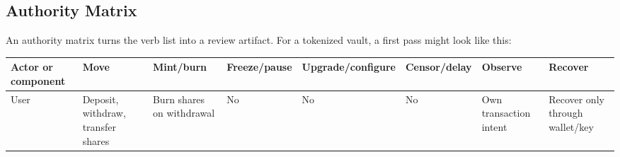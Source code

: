 \subsection{Authority Matrix}

An authority matrix turns the verb list into a review artifact. For a
tokenized vault, a first pass might look like this:

{\def\LTcaptype{none} %
\begin{longtable}[]{@{}
  >{\raggedright\arraybackslash}p{}
  >{\raggedright\arraybackslash}p{}
  >{\raggedright\arraybackslash}p{}
  >{\raggedright\arraybackslash}p{}
  >{\raggedright\arraybackslash}p{}
  >{\raggedright\arraybackslash}p{}
  >{\raggedright\arraybackslash}p{}
  >{\raggedright\arraybackslash}p{}@{}}
\toprule\noalign{}
\begin{minipage}[b]{\linewidth}\raggedright
Actor or component
\end{minipage} & \begin{minipage}[b]{\linewidth}\raggedright
Move
\end{minipage} & \begin{minipage}[b]{\linewidth}\raggedright
Mint/burn
\end{minipage} & \begin{minipage}[b]{\linewidth}\raggedright
Freeze/pause
\end{minipage} & \begin{minipage}[b]{\linewidth}\raggedright
Upgrade/configure
\end{minipage} & \begin{minipage}[b]{\linewidth}\raggedright
Censor/delay
\end{minipage} & \begin{minipage}[b]{\linewidth}\raggedright
Observe
\end{minipage} & \begin{minipage}[b]{\linewidth}\raggedright
Recover
\end{minipage} \\
\midrule\noalign{}
\endhead
\bottomrule\noalign{}
\endlastfoot
User & Deposit, withdraw, transfer shares & Burn shares on withdrawal &
No & No & No & Own transaction intent & Recover only through wallet/key

\end{longtable}}
